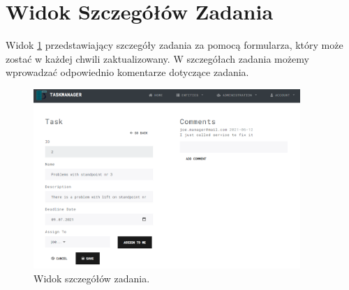 \section{Widok Szczegółów Zadania}
 Widok \ref{taskcomm} przedstawiający szczegóły zadania za pomocą formularza, który może zostać w każdej chwili zaktualizowany. W szczegółach zadania możemy wprowadzać odpowiednio komentarze dotyczące zadania. 
\begin{figure}[h!]
	\centering
	\includegraphics[width=0.90\textwidth]{taskcomm}
	
	\caption{Widok szczegółów zadania.}
	\label{taskcomm}
\end{figure}